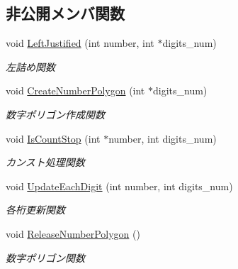 \subsection*{非公開メンバ関数}
\begin{DoxyCompactItemize}
\item 
void \mbox{\hyperlink{class_numbers_polygon_a4a6a8af758018e75e9b670ffe3fd522f}{Left\+Justified}} (int number, int $\ast$digits\+\_\+num)
\begin{DoxyCompactList}\small\item\em 左詰め関数 \end{DoxyCompactList}\item 
void \mbox{\hyperlink{class_numbers_polygon_a39fb3c9662ff26a96dedad55ed7c400e}{Create\+Number\+Polygon}} (int $\ast$digits\+\_\+num)
\begin{DoxyCompactList}\small\item\em 数字ポリゴン作成関数 \end{DoxyCompactList}\item 
void \mbox{\hyperlink{class_numbers_polygon_acaa10c09e6175955a7bbd3570b2374f7}{Is\+Count\+Stop}} (int $\ast$number, int digits\+\_\+num)
\begin{DoxyCompactList}\small\item\em カンスト処理関数 \end{DoxyCompactList}\item 
void \mbox{\hyperlink{class_numbers_polygon_a2dd5cc3613e90c5e7db7cf8428ed5026}{Update\+Each\+Digit}} (int number, int digits\+\_\+num)
\begin{DoxyCompactList}\small\item\em 各桁更新関数 \end{DoxyCompactList}\item 
void \mbox{\hyperlink{class_numbers_polygon_ac390451fecd827478f88342e91c38428}{Release\+Number\+Polygon}} ()
\begin{DoxyCompactList}\small\item\em 数字ポリゴン関数 \end{DoxyCompactList}\end{DoxyCompactItemize}
